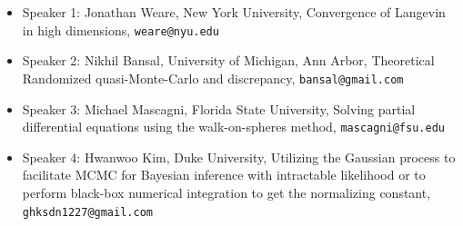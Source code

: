 \documentclass[12pt,a4paper,figuresright]{book}
\begin{document}
\begin{itemize}

\item Speaker 1: Jonathan Weare, New York University, Convergence of Langevin in high dimensions, \texttt{weare@nyu.edu}
    
\item Speaker 2: Nikhil Bansal, University of Michigan, Ann Arbor, Theoretical Randomized quasi-Monte-Carlo and discrepancy, \texttt{bansal@gmail.com}
    
\item Speaker 3: Michael Mascagni, Florida State University, Solving partial differential equations using the walk-on-spheres method, \texttt{mascagni@fsu.edu}
    
\item Speaker 4: Hwanwoo Kim, Duke University, Utilizing the Gaussian process to facilitate MCMC for Bayesian inference with intractable likelihood or to perform black-box numerical integration to get the normalizing constant, \texttt{ghksdn1227@gmail.com}
\end{itemize}

\end{document}
